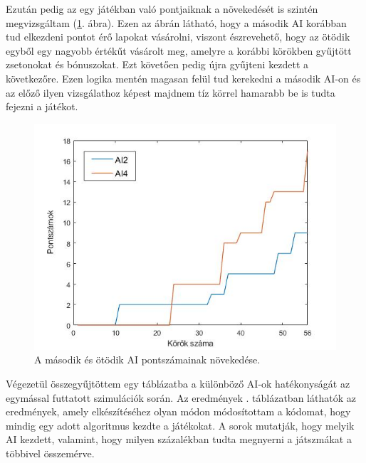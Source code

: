 Ezután pedig az egy játékban való pontjaiknak a növekedését is szintén megvizsgáltam (\ref{fig:player_scores2v5}. ábra). Ezen az ábrán látható, hogy a második AI korábban tud elkezdeni pontot érő lapokat vásárolni, viszont észrevehető, hogy az ötödik egyből egy nagyobb értékűt vásárolt meg, amelyre a korábbi körökben gyűjtött zsetonokat és bónuszokat. Ezt követően pedig újra gyűjteni kezdett a következőre. Ezen logika mentén magasan felül tud kerekedni a második AI-on és az előző ilyen vizsgálathoz képest majdnem tíz körrel hamarabb be is tudta fejezni a játékot.

\begin{figure}[h]
\centering
\includegraphics[scale=0.5]{images/player_points_AI2vsAI5.jpg}
\caption{A második és ötödik AI pontszámainak növekedése.}
\label{fig:player_scores2v5}
\end{figure}




Végezetül összegyűjtöttem egy táblázatba a különböző AI-ok hatékonyságát az egymással futtatott szimulációk során. Az eredmények . táblázatban láthatók az eredmények, amely elkészítéséhez olyan módon módosítottam a kódomat, hogy mindig egy adott algoritmus kezdte a játékokat. A sorok mutatják, hogy melyik AI kezdett, valamint, hogy milyen százalékban tudta megnyerni a játszmákat a többivel összemérve.

